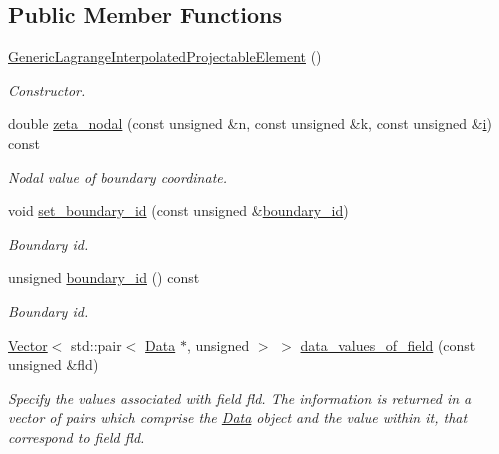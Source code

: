 \subsection*{Public Member Functions}
\begin{DoxyCompactItemize}
\item 
\hyperlink{classoomph_1_1GenericLagrangeInterpolatedProjectableElement_aae33ce61dab0f7b8ae9f1f2281650932}{Generic\+Lagrange\+Interpolated\+Projectable\+Element} ()
\begin{DoxyCompactList}\small\item\em Constructor. \end{DoxyCompactList}\item 
double \hyperlink{classoomph_1_1GenericLagrangeInterpolatedProjectableElement_a8168307c01e7d086dae283aa1c543226}{zeta\+\_\+nodal} (const unsigned \&n, const unsigned \&k, const unsigned \&\hyperlink{cfortran_8h_adb50e893b86b3e55e751a42eab3cba82}{i}) const
\begin{DoxyCompactList}\small\item\em Nodal value of boundary coordinate. \end{DoxyCompactList}\item 
void \hyperlink{classoomph_1_1GenericLagrangeInterpolatedProjectableElement_abf8497b3e3327ec6c0766c8dca09b4c9}{set\+\_\+boundary\+\_\+id} (const unsigned \&\hyperlink{classoomph_1_1GenericLagrangeInterpolatedProjectableElement_a54b4d5fe8b28df0937ffb61eb731108e}{boundary\+\_\+id})
\begin{DoxyCompactList}\small\item\em Boundary id. \end{DoxyCompactList}\item 
unsigned \hyperlink{classoomph_1_1GenericLagrangeInterpolatedProjectableElement_a54b4d5fe8b28df0937ffb61eb731108e}{boundary\+\_\+id} () const
\begin{DoxyCompactList}\small\item\em Boundary id. \end{DoxyCompactList}\item 
\hyperlink{classoomph_1_1Vector}{Vector}$<$ std\+::pair$<$ \hyperlink{classoomph_1_1Data}{Data} $\ast$, unsigned $>$ $>$ \hyperlink{classoomph_1_1GenericLagrangeInterpolatedProjectableElement_abbf541f3b88a4b0acc89f4b6f252de3b}{data\+\_\+values\+\_\+of\+\_\+field} (const unsigned \&fld)
\begin{DoxyCompactList}\small\item\em Specify the values associated with field fld. The information is returned in a vector of pairs which comprise the \hyperlink{classoomph_1_1Data}{Data} object and the value within it, that correspond to field fld. \end{DoxyCompactList}\item 

\end{DoxyCompactItemize}
